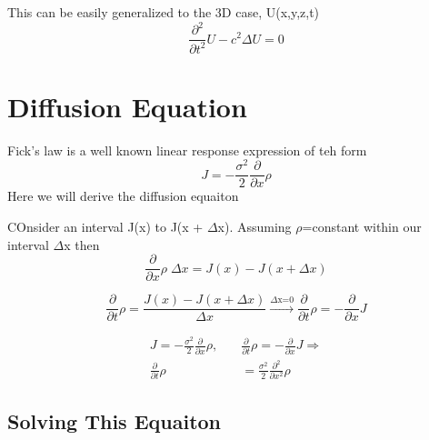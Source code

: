 \documentclass{article}
\newcommand{\be}{\begin{equation}}
\newcommand{\ee}{\end{equation}}
\newcommand{\pd}{\partial}
\newcommand{\prt}{\frac{\pd}{\pd t}}
\newcommand{\prts}{\frac{\pd^2}{\pd t^2}}
\newcommand{\prx}{\frac{\pd}{\pd x}}
\newcommand{\prxs}{\frac{\pd^2}{\pd x^2}}
\begin{document}
This can be easily generalized to the 3D case, U(x,y,z,t)
\be
\prts U - c^2 \Delta U = 0
\ee


\section{Diffusion Equation}
Fick's law is a well known linear response expression of teh form
\be
J = -\frac{\sigma^2}{2}\prx \rho
\ee
Here we will derive the diffusion equaiton

COnsider an interval J(x) to J(x + $\Delta$x).
Assuming $\rho$=constant within our interval $\Delta$x then
\be
\prx \rho\; \Delta x = J(x) - J(x+\Delta x)
\ee

\be
\prt \rho = \frac{J(x) - J(x+\Delta x)}{\Delta x} \xrightarrow{\text{$\Delta$x=0}} \prt \rho= -\prx J
\ee

\be
\begin{split}
    J = -\frac{\sigma^2}{2}\prx \rho, \quad&  \prt \rho= -\prx J \Rightarrow \\
    \prt \rho &= \frac{\sigma^2}{2}\prxs \rho
\end{split}
\ee

\subsection{Solving This Equaiton}
\end{document}
